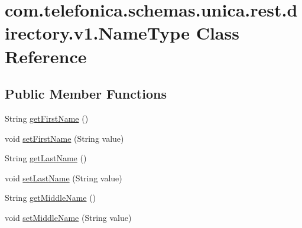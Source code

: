 \hypertarget{classcom_1_1telefonica_1_1schemas_1_1unica_1_1rest_1_1directory_1_1v1_1_1NameType}{
\section{com.telefonica.schemas.unica.rest.directory.v1.NameType Class Reference}
\label{classcom_1_1telefonica_1_1schemas_1_1unica_1_1rest_1_1directory_1_1v1_1_1NameType}
}
\subsection*{Public Member Functions}
\begin{DoxyCompactItemize}
\item 
String \hyperlink{classcom_1_1telefonica_1_1schemas_1_1unica_1_1rest_1_1directory_1_1v1_1_1NameType_af71f9ec9bdd7f253c7df85281ad29548}{getFirstName} ()
\item 
void \hyperlink{classcom_1_1telefonica_1_1schemas_1_1unica_1_1rest_1_1directory_1_1v1_1_1NameType_a11e0f11ce3874c8ecc59ed936041a7bb}{setFirstName} (String value)
\item 
String \hyperlink{classcom_1_1telefonica_1_1schemas_1_1unica_1_1rest_1_1directory_1_1v1_1_1NameType_a67f32c4ea5ac060a296fbe9df90c76d6}{getLastName} ()
\item 
void \hyperlink{classcom_1_1telefonica_1_1schemas_1_1unica_1_1rest_1_1directory_1_1v1_1_1NameType_a0e2d508649b26221d247a4c86c9250ac}{setLastName} (String value)
\item 
String \hyperlink{classcom_1_1telefonica_1_1schemas_1_1unica_1_1rest_1_1directory_1_1v1_1_1NameType_ad22643416c1164ea7f5d1f7b70013012}{getMiddleName} ()
\item 
void \hyperlink{classcom_1_1telefonica_1_1schemas_1_1unica_1_1rest_1_1directory_1_1v1_1_1NameType_ab7645ef54f7fdb2746824c8fd7388bc0}{setMiddleName} (String value)
\end{DoxyCompactItemize}
